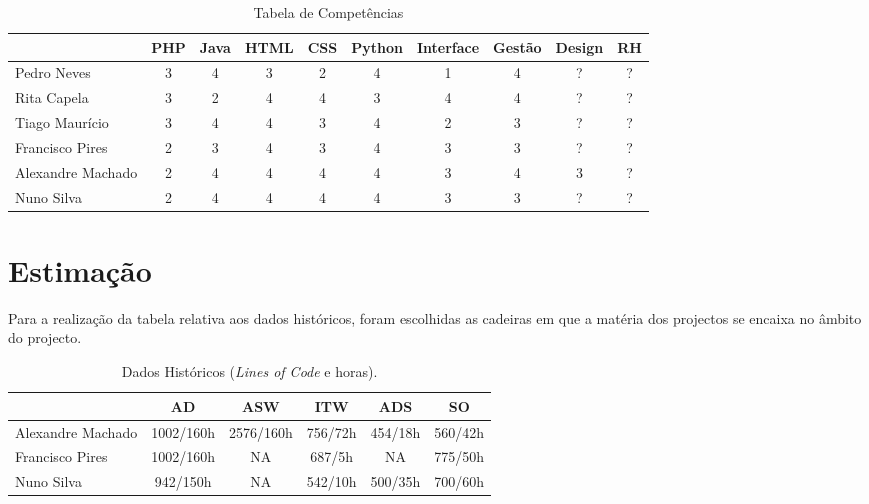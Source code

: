\documentclass[12pt, a4paper, twoside]{report} %
\begin{document}
\begin{table}[h]
\centering
\begin{tabular}{|l|c c c c c c c c c|}
\hline
                  & PHP & Java & HTML & CSS & Python & Interface & Gestão  & Design & RH\\ \hline
Pedro Neves       & 3   & 4    & 3    & 2   & 4      & 1         & 4       & ?      & ?     \\ \hline
Rita Capela       & 3   & 2    & 4    & 4   & 3      & 4         & 4       & ?      & ?     \\ \hline
Tiago Maurício    & 3   & 4    & 4    & 3   & 4      & 2         & 3       & ?      & ?     \\ \hline
Francisco Pires   & 2   & 3    & 4    & 3   & 4      & 3         & 3       & ?      & ?     \\ \hline
Alexandre Machado & 2   & 4    & 4    & 4   & 4      & 3         & 4       & 3      & ?     \\ \hline
Nuno Silva        & 2   & 4    & 4    & 4   & 4      & 3         & 3       & ?      & ?     \\ \hline
\end{tabular}
\caption{Tabela de Competências}
\label{competencias}
\end{table}

\clearpage


\section{Estimação}

Para a realização da tabela relativa aos dados históricos, foram escolhidas as cadeiras em que a matéria dos projectos se encaixa no âmbito do projecto.

\begin{table}[h]
\centering
\begin{tabular}{|l|c c c c c|}
\hline
                  & AD        & ASW       & ITW     & ADS     & SO      \\ \hline
Alexandre Machado & 1002/160h & 2576/160h & 756/72h & 454/18h & 560/42h \\ \hline
Francisco Pires   & 1002/160h & NA        & 687/5h  & NA      & 775/50h \\ \hline
Nuno Silva        & 942/150h  & NA        & 542/10h & 500/35h & 700/60h\\ \hline
\end{tabular}
\caption{ Dados Históricos (\textit{Lines of Code} e horas).}
\label{my-label}
\end{table}
\end{document}
